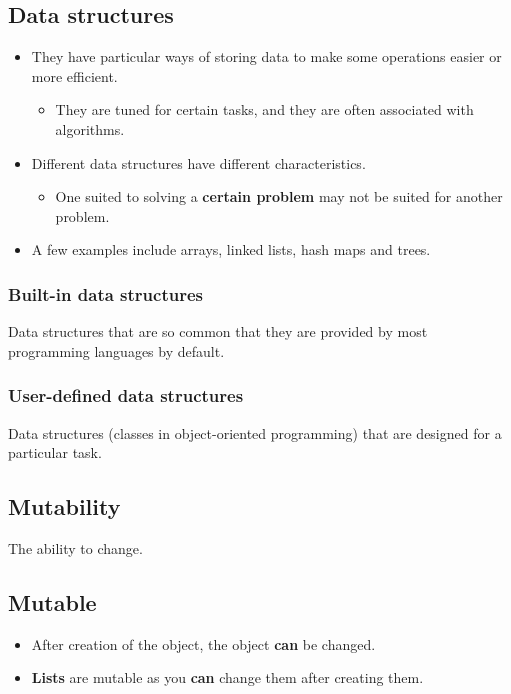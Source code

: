 \documentclass[11pt]{article}
\begin{document}
\subsection{Data structures}
\label{sec:orgc7cf4c5}
\begin{itemize}
\item They have particular ways of storing data to make some operations easier or more efficient.
\begin{itemize}
\item They are tuned for certain tasks, and they are often associated with algorithms.
\end{itemize}
\item Different data structures have different characteristics.
\begin{itemize}
\item One suited to solving a \textbf{certain problem} may not be suited for another problem.
\end{itemize}
\item A few examples include arrays, linked lists, hash maps and trees.
\end{itemize}

\subsubsection{Built-in data structures}
\label{sec:orga84fde4}
Data structures that are so common that they are provided by most programming languages by default.

\subsubsection{User-defined data structures}
\label{sec:org8c4e500}
Data structures (classes in object-oriented programming) that are designed for a particular task.

\subsection{Mutability}
\label{sec:org516f33b}
The ability to change.

\subsection{Mutable}
\label{sec:org50d6daf}
\begin{itemize}
\item After creation of the object, the object \textbf{can} be changed.
\item \textbf{Lists} are mutable as you \textbf{can} change them after creating them.
\end{itemize}
\end{document}

